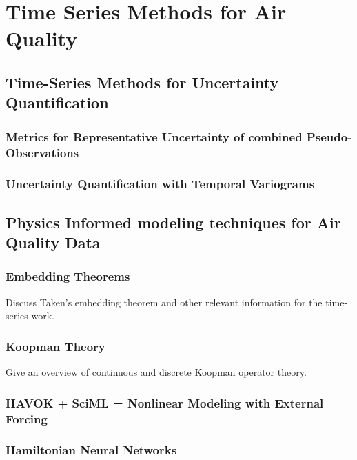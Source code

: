 \chapter{Time Series Methods for Air Quality}

\section{Time-Series Methods for Uncertainty Quantification}
\subsection{Metrics for Representative Uncertainty of combined Pseudo-Observations}
\subsection{Uncertainty Quantification with Temporal Variograms}

\section{Physics Informed modeling techniques for Air Quality Data}
\subsection{Embedding Theorems}
Discuss Taken's embedding theorem and other relevant information for the time-series work.
\subsection{Koopman Theory}
Give an overview of continuous and discrete Koopman operator theory.
\subsection{HAVOK + SciML = Nonlinear Modeling with External Forcing}
\subsection{Hamiltonian Neural Networks}

